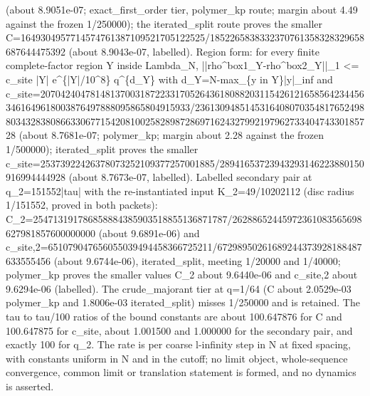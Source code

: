 \begin{gatequote}
(about 8.9051e-07; exact\_first\_order tier, polymer\_kp route; margin about
4.49 against the frozen 1/250000); the iterated\_split route proves the
smaller
C=1649\allowbreak{}304957\allowbreak{}714574\allowbreak{}761387\allowbreak{}109521\allowbreak{}705122\allowbreak{}525/18\allowbreak{}522658\allowbreak{}383323\allowbreak{}707613\allowbreak{}583283\allowbreak{}296586\allowbreak{}876444\allowbreak{}75392
(about 8.9043e-07, labelled). Region form: for every finite complete-factor
region Y inside Lambda\_N,
||rho\textasciicircum{}box1\_Y-rho\textasciicircum{}box2\_Y||\_1 <= c\_site
|Y| e\textasciicircum{}\{|Y|/10\textasciicircum{}8\}
q\textasciicircum{}\{d\_Y\} with d\_Y=N-max\_\{y in Y\}|y|\_inf and
c\_site\allowbreak{}=20704\allowbreak{}240478\allowbreak{}148137\allowbreak{}003187\allowbreak{}223317\allowbreak{}052643\allowbreak{}618088\allowbreak{}203115\allowbreak{}426121\allowbreak{}658564\allowbreak{}234456\allowbreak{}346164\allowbreak{}961800\allowbreak{}387649\allowbreak{}788809\allowbreak{}586580\allowbreak{}491593\allowbreak{}3/2361\allowbreak{}309485\allowbreak{}145316\allowbreak{}408070\allowbreak{}354817\allowbreak{}652498\allowbreak{}803432\allowbreak{}838086\allowbreak{}633067\allowbreak{}715420\allowbreak{}810025\allowbreak{}828987\allowbreak{}286971\allowbreak{}624327\allowbreak{}992197\allowbreak{}962733\allowbreak{}404743\allowbreak{}301857\allowbreak{}28
(about 8.7681e-07; polymer\_kp; margin about 2.28 against the frozen
1/500000); iterated\_split proves the smaller
c\_site\allowbreak{}=25373\allowbreak{}922426\allowbreak{}378073\allowbreak{}252109\allowbreak{}377257\allowbreak{}001885\allowbreak{}/28941\allowbreak{}653723\allowbreak{}943293\allowbreak{}146223\allowbreak{}880150\allowbreak{}916994\allowbreak{}444928
(about 8.7673e-07, labelled). Labelled secondary pair at q\_2=151552|tau| with
the re-instantiated input K\_2=49/10202112 (disc radius 1/151552, proved in
both packets):
C\_2=25\allowbreak{}471319\allowbreak{}178685\allowbreak{}888438\allowbreak{}590351\allowbreak{}885513\allowbreak{}687178\allowbreak{}7/2628\allowbreak{}865244\allowbreak{}597236\allowbreak{}108356\allowbreak{}569862\allowbreak{}798185\allowbreak{}760000\allowbreak{}0000
(about 9.6891e-06) and
c\_site\allowbreak{},2=651\allowbreak{}079047\allowbreak{}656055\allowbreak{}039494\allowbreak{}458366\allowbreak{}725211\allowbreak{}/67298\allowbreak{}950261\allowbreak{}689244\allowbreak{}373928\allowbreak{}188487\allowbreak{}633555\allowbreak{}456
(about 9.6744e-06), iterated\_split, meeting 1/20000 and 1/40000; polymer\_kp
proves the smaller values C\_2 about 9.6440e-06 and c\_site,2 about 9.6294e-06
(labelled). The crude\_majorant tier at q=1/64 (C about 2.0529e-03 polymer\_kp
and 1.8006e-03 iterated\_split) misses 1/250000 and is retained. The tau to
tau/100 ratios of the bound constants are about 100.647876 for C and
100.647875 for c\_site, about 1.001500 and 1.000000 for the secondary pair,
and exactly 100 for q\_2. The rate is per coarse l-infinity step in N at fixed
spacing, with constants uniform in N and in the cutoff; no limit object,
whole-sequence convergence, common limit or translation statement is formed,
and no dynamics is asserted.
\end{gatequote}
